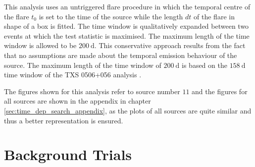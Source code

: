 This analysis uses an untriggered flare procedure in which the temporal centre of the flare $t_0$ is set to the time of the source while the length $dt$ of the flare in shape of a box is fitted.
The time window is qualitatively expanded between two events at which the test statistic is maximised.
The maximum length of the time window is allowed to be $\SI{200}{\day}$.
This conservative approach results from the fact that no assumptions are made about the temporal emission behaviour of the source.
The maximum length of the time window of $\SI{200}{\day}$ is based on the $\SI{158}{\day}$ time window of the TXS 0506+056 analysis \cite{_txs}.

The figures shown for this analysis refer to source number $\num{11}$ and the figures for all sources are shown in the appendix in chapter \ref{sec:time_dep_search_appendix}, as the plots of all sources are quite similar and thus a better representation is ensured.

\section{Background Trials}

